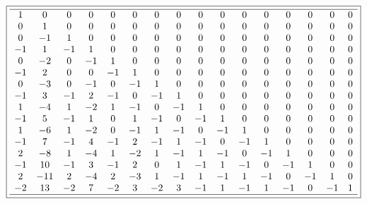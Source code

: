 \documentclass[10pt,reqno]{amsart}
\numberwithin{figure}{section}
\numberwithin{table}{section}
\theoremstyle{plain}
\numberwithin{theorem}{section}
\theoremstyle{remark}
\begin{document}
\begin{figure}[ht!]

\begin{minipage}{\linewidth} 
\begin{center} 
\tiny
\begin{equation*} 
\boxed{ 
\begin{array}{cccccccccccccccccc} \hline 
 1 & 0 & 0 & 0 & 0 & 0 & 0 & 0 & 0 & 0 & 0 & 0 & 0 & 0 & 0 & 0 \\
 0 & 1 & 0 & 0 & 0 & 0 & 0 & 0 & 0 & 0 & 0 & 0 & 0 & 0 & 0 & 0 \\
 0 & -1 & 1 & 0 & 0 & 0 & 0 & 0 & 0 & 0 & 0 & 0 & 0 & 0 & 0 & 0 \\
 -1 & 1 & -1 & 1 & 0 & 0 & 0 & 0 & 0 & 0 & 0 & 0 & 0 & 0 & 0 & 0 \\
 0 & -2 & 0 & -1 & 1 & 0 & 0 & 0 & 0 & 0 & 0 & 0 & 0 & 0 & 0 & 0 \\
 -1 & 2 & 0 & 0 & -1 & 1 & 0 & 0 & 0 & 0 & 0 & 0 & 0 & 0 & 0 & 0 \\
 0 & -3 & 0 & -1 & 0 & -1 & 1 & 0 & 0 & 0 & 0 & 0 & 0 & 0 & 0 & 0 \\
 -1 & 3 & -1 & 2 & -1 & 0 & -1 & 1 & 0 & 0 & 0 & 0 & 0 & 0 & 0 & 0 \\
 1 & -4 & 1 & -2 & 1 & -1 & 0 & -1 & 1 & 0 & 0 & 0 & 0 & 0 & 0 & 0 \\
 -1 & 5 & -1 & 1 & 0 & 1 & -1 & 0 & -1 & 1 & 0 & 0 & 0 & 0 & 0 & 0 \\
 1 & -6 & 1 & -2 & 0 & -1 & 1 & -1 & 0 & -1 & 1 & 0 & 0 & 0 & 0 & 0 \\
 -1 & 7 & -1 & 4 & -1 & 2 & -1 & 1 & -1 & 0 & -1 & 1 & 0 & 0 & 0 & 0 \\
 2 & -8 & 1 & -4 & 1 & -2 & 1 & -1 & 1 & -1 & 0 & -1 & 1 & 0 & 0 & 0 \\
 -1 & 10 & -1 & 3 & -1 & 2 & 0 & 1 & -1 & 1 & -1 & 0 & -1 & 1 & 0 & 0 \\
 2 & -11 & 2 & -4 & 2 & -3 & 1 & -1 & 1 & -1 & 1 & -1 & 0 & -1 & 1 & 0 \\
 -2 & 13 & -2 & 7 & -2 & 3 & -2 & 3 & -1 & 1 & -1 & 1 & -1 & 0 & -1 & 1 \\
 \hline
\end{array}
}
\end{equation*}
\end{center} 
\end{minipage} 


\end{figure}
\end{document}
